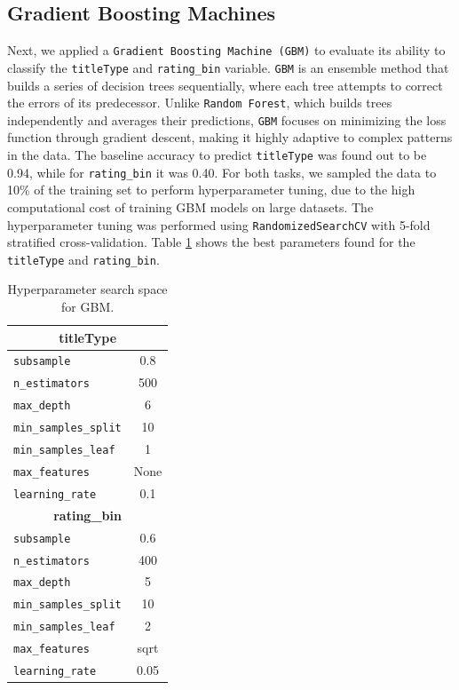 \subsection{Gradient Boosting Machines}
Next, we applied a \texttt{Gradient Boosting Machine (GBM)} to evaluate its ability to classify the \texttt{titleType} and \texttt{rating\_bin} variable. 
\texttt{GBM} is an ensemble method that builds a series of decision trees sequentially, where each tree attempts to correct 
the errors of its predecessor. Unlike \texttt{Random Forest}, which builds trees independently and averages their predictions, 
\texttt{GBM} focuses on minimizing the loss function through gradient descent, making it highly adaptive to complex patterns in the data.
The baseline accuracy to predict \texttt{titleType} was found out to be 0.94, while for \texttt{rating\_bin} it was 0.40.
For both tasks, we sampled the data to 10\% of the training set to perform hyperparameter tuning, 
due to the high computational cost of training GBM models on large datasets.
The hyperparameter tuning was performed using \texttt{RandomizedSearchCV} with 5-fold stratified cross-validation.
Table \ref{tab:GBM_param} shows the best parameters found for the \texttt{titleType} and \texttt{rating\_bin}.
\begin{table}[H]
    \centering
    \begin{minipage}{0.4\textwidth}
        \centering
        \begin{tabular}{lc}
        \hline
        \multicolumn{2}{c}{\textbf{titleType}} \\
        \hline
        \texttt{subsample} & 0.8 \\
        \texttt{n\_estimators} & 500 \\
        \texttt{max\_depth} & 6 \\
        \texttt{min\_samples\_split} & 10 \\
        \texttt{min\_samples\_leaf} & 1 \\
        \texttt{max\_features} & None \\
        \texttt{learning\_rate} & 0.1 \\
        \hline
        \multicolumn{2}{c}{\textbf{rating\_bin}} \\
        \hline
        \texttt{subsample} & 0.6 \\
        \texttt{n\_estimators} & 400 \\
        \texttt{max\_depth} & 5 \\
        \texttt{min\_samples\_split} & 10 \\
        \texttt{min\_samples\_leaf} & 2 \\
        \texttt{max\_features} & sqrt \\
        \texttt{learning\_rate} & 0.05 \\
        \hline
        \end{tabular}
        \caption{Hyperparameter search space for GBM.}
        \label{tab:GBM_param}
    \end{minipage}
    
\end{table}

